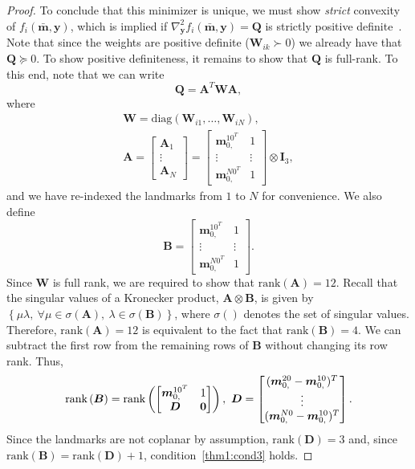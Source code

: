 \documentclass[lettersize,journal]{IEEEtran}
\newcommand{\rank}[1]{\mbox{rank}\left(#1\right)}
\newcommand{\diag}[1]{\mbox{diag}\left(#1\right)}
\begin{document}
\begin{proof}
To conclude that this minimizer is unique, we must show \emph{strict} convexity of $f_i(\bar{\bm{m}},\bm{y})$, which is implied if $\nabla_{\bm{y}}^2 f_i(\bar{\bm{m}},\bm{y}) = \bm{Q} $ is strictly positive definite~\cite{boydConvexOptimization2004}. Note that since the weights are positive definite ($\bm{W}_{ik}\succ 0 $) we already have that $\bm{Q} \succeq 0$. To show positive definiteness, it remains to show that $\bm{Q}$ is full-rank. To this end, note that we can write
\begin{equation}
	\bm{Q} = \bm{A}^T \bm{W} \bm{A},
\end{equation}
where
\begin{gather}
	\bm{W} = \diag{\bm{W}_{i1},\ldots,\bm{W}_{iN}},\\
	\bm{A} = \begin{bmatrix}
		 \bm{A}_1 \\ \vdots \\ \bm{A}_N
	\end{bmatrix} = \begin{bmatrix}
		 \bm{m}_{0,}^{10^T} & 1 \\
		 \vdots& \vdots\\
		 \bm{m}_{0,}^{N0^T} & 1
	\end{bmatrix}\otimes \bm{I}_3,
\end{gather}
and we have re-indexed the landmarks from $1$ to $N$ for convenience. We also define
\begin{equation*}
	\bm{B} = \begin{bmatrix}
		\bm{m}_{0,}^{10^T} & 1 \\
		\vdots&\vdots\\
		\bm{m}_{0,}^{N0^T} & 1
	\end{bmatrix}.
\end{equation*}
Since $\bm{W}$ is full rank, we are required to show that $\rank{\bm{A}} = 12$. 
Recall that the singular values  of a Kronecker product, $\bm{A}\otimes\bm{B}$, is given by $\left\{ \mu\lambda,~ \forall \mu \in \sigma(\bm{A}),~ \lambda \in \sigma(\bm{B})\right\}$, where $\sigma()$ denotes the set of singular values.
Therefore, $\rank{\bm{A}} = 12$ is equivalent to the fact that $\rank{\bm{B}}=4$. We can subtract the first row from the remaining rows of $\bm{B}$ without changing its row rank. Thus,
\begin{equation*}
	\rank{\bm{B}} = \rank{\begin{bmatrix}
			\bm{m}_{0,}^{10^T} & 1 \\
			\bm{D} & \bm{0}
		\end{bmatrix}}, ~ \bm{D} = \begin{bmatrix}
		(\bm{m}_{0,}^{20}-\bm{m}_{0,}^{10})^T  \\
		\vdots\\
		(\bm{m}_{0,}^{N0}-\bm{m}_{0,}^{10})^T 
	\end{bmatrix}.\\	
\end{equation*}
Since the landmarks are not coplanar by assumption, $\rank{\bm{D}}=3$ and, since $\rank{\bm{B}} = \rank{\bm{D}} + 1$, condition~\ref{thm1:cond3} holds.
 

\end{proof}
\end{document}

